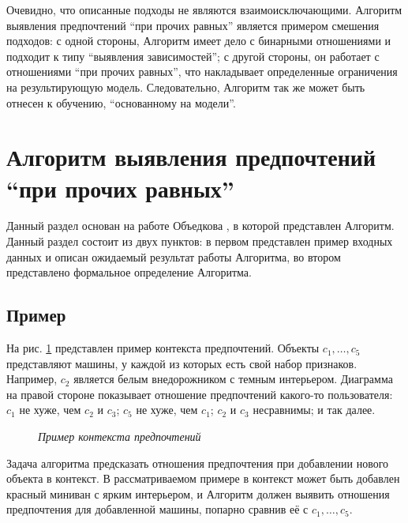 		Очевидно, что описанные подходы не являются взаимоисключающими. Алгоритм выявления предпочтений \enquote{при прочих равных} является примером смешения подходов: с одной стороны, Алгоритм имеет дело с бинарными отношениями и подходит к типу ``выявления зависимостей''; с другой стороны, он работает с отношениями \enquote{при прочих равных}, что накладывает определенные ограничения на результирующую модель. Следовательно, Алгоритм так же может быть отнесен к обучению, ``основанному на модели''.
	
	
\section[Алгоритм выявления предпочтений \enquote{при прочих равных}]{ Алгоритм выявления предпочтений \\ \enquote{при прочих равных}}

	Данный раздел основан на работе Объедкова \cite{Obiedkov:2013}, в которой представлен Алгоритм. Данный раздел состоит из двух пунктов: в первом представлен пример входных данных и описан ожидаемый результат работы Алгоритма, во втором представлено формальное определение Алгоритма.
	
	\subsection{Пример}
	\label{subsection:example}
		На рис. \ref{fig:pcxt} представлен пример контекста предпочтений. Объекты $c_1, \dotsc, c_5$ представляют машины, у каждой из которых есть свой набор признаков. Например, $c_2$ является белым внедорожником с темным интерьером. Диаграмма на правой стороне показывает отношение предпочтений какого-то пользователя: $c_1$ не хуже, чем $c_2$ и $c_3$; $c_5$ не хуже, чем $c_1$; $c_2$ и $c_3$ несравнимы; и так далее. 
		\begin{figure}
			\begin{center} 
				\cars \prefs
				\caption{\it Пример контекста предпочтений \cite[Рис.~1.1]{Obiedkov:2013}}
				\label{fig:pcxt}	
			\end{center} 
		\end{figure} 
		
		Задача алгоритма предсказать отношения предпочтения при добавлении нового объекта в контекст. В рассматриваемом примере в контекст может быть добавлен красный миниван с ярким интерьером, и Алгоритм должен выявить отношения предпочтения для добавленной машины, попарно сравнив её с $c_1, \dotsc, c_5$. 
	
